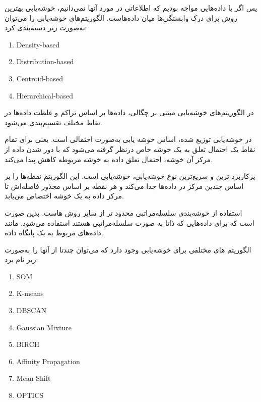 \begin{enumerate}
\begin{qsolve}
	
پس اگر با داده‌هایی مواجه بودیم که اطلاعاتی در مورد آنها نمی‌دانیم،‌ خوشه‌یابی بهترین روش برای درک وابستگی‌ها میان داده‌هاست. الگوریتم‌های خوشه‌یابی را می‌توان به‌صورت زیر دسته‌بندی کرد:

	\begin{latin}
		\begin{enumerate}
			\item Density-based
			\item Distribution-based
			\item Centroid-based
			\item Hierarchical-based
		\end{enumerate}
	\end{latin}
	
	در الگوریتم‌های خوشه‌یابی مبتنی بر چگالی، داده‌ها بر اساس تراکم و غلظت داده‌ها در نقاط مختلف تقسیم‌بندی می‌شود. 
	\end{qsolve}
	
	
	
	\begin{qsolve}
در خوشه‌یابی توزیع شده، اساس خوشه یابی به‌صورت احتمالی است. یعنی برای تمام نقاط یک احتمال تعلق به یک خوشه خاص درنظر گرفته می‌شود که با دور شدن داده از مرکز آن خوشه، احتمال تعلق داده به خوشه مربوطه کاهش پیدا می‌کند.

پرکاربرد ترین و سریع‌ترین نوع خوشه‌یابی، خوشه‌یابی  است. این الگوریتم نقطه‌ها را بر اساس چندین مرکز در داده‌ها جدا می‌کند و هر نقطه بر اساس مجذور فاصله‌اش تا مرکز داده به یک خوشه اختصاص می‌یابد.

استفاده از خوشه‌بندی سلسله‌مراتبی محدود تر از سایر روش هاست. بدین صورت است که برای داده‌هایی که ذاتا به صورت سلسله‌مراتبی هستند استفاده می‌شود. مانند داده‌های مربوط به یک پایگاه داده.

الگوریتم های مختلفی برای خوشه‌یابی وجود دارد که می‌توان چندتا از آنها را به‌صورت زیر نام برد:

	\begin{latin}
		\begin{enumerate}
			\item SOM
			\item K-means
			\item DBSCAN
			\item Gaussian Mixture
			\item BIRCH
			\item Affinity Propagation
			\item Mean-Shift
			\item OPTICS
		\end{enumerate}
	\end{latin}
	

\end{qsolve}
\end{enumerate}
